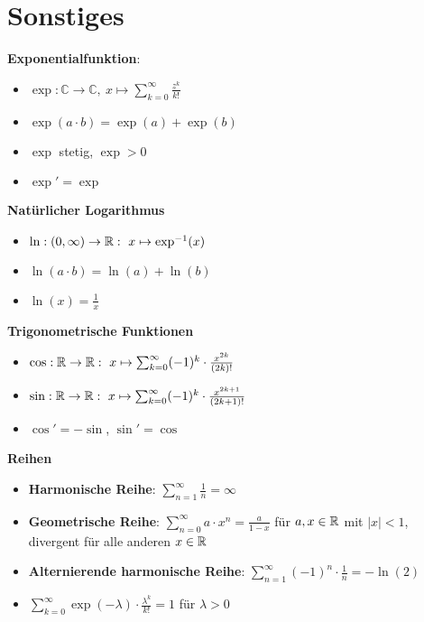 \section{Sonstiges}


\textbf{Exponentialfunktion}:
\begin{itemize}
\item $\exp:\mathbb{C}\to\mathbb{C},\ x\mapsto\sum_{k=0}^\infty \frac{z^k}{k!}$

\item $\exp(a\cdot b)=\exp(a)+\exp(b)$

\item $\exp$ stetig, $\exp>0$

\item $\exp'=\exp$
\end{itemize}

\textbf{Natürlicher Logarithmus}
\begin{itemize}
\item $\ln: (0,\infty)\to\R:\ x\mapsto\exp^{-1}(x)$

\item $\ln(a\cdot b)=\ln(a)+\ln(b)$

\item $\ln(x)=\frac{1}{x}$
\end{itemize}

\textbf{Trigonometrische Funktionen}
\begin{itemize}
\item $\cos:\R\to\R:\ x\mapsto\sum_{k=0}^\infty (-1)^k\cdot\frac{x^{2k}}{(2k)!}$

\item $\sin:\R\to\R:\ x\mapsto\sum_{k=0}^\infty (-1)^k\cdot\frac{x^{2k+1}}{(2k+1)!}$

\item $\cos' = -\sin$, $\sin' = \cos$
\end{itemize}

\textbf{Reihen}
\begin{itemize}
\item \textbf{Harmonische Reihe}: $\sum_{n=1}^\infty \frac{1}{n}=\infty$

\item \textbf{Geometrische Reihe}: $\sum_{n=0}^\infty a\cdot x^n = \frac{a}{1-x}$
für $a,x\in\mathbb{R}$ mit $|x|<1$, divergent für alle anderen $x\in\mathbb{R}$

\item \textbf{Alternierende harmonische Reihe}:
$\sum_{n=1}^\infty (-1)^n\cdot\frac{1}{n}=-\ln(2)$

\item $\sum_{k=0}^\infty\exp(-\lambda)\cdot\frac{\lambda^k}{k!}=1$ für $\lambda>0$
\end{itemize}